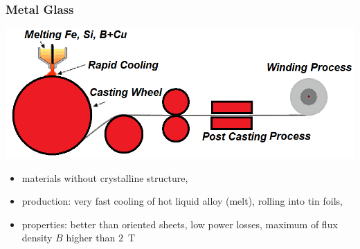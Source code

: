 \documentclass{beamer}
\begin{document}
	\begin{frame}
	\frametitle{Metal Glass}
	\begin{center}
		\includegraphics[scale=0.38]{obr10_amorfniKov.png}
	\end{center}
	
	\begin{itemize}
		\item materials without crystalline structure,
		\item production: very fast cooling of hot liquid alloy (melt), rolling into tin foils,
		\item properties: better than oriented sheets, low power losses, maximum of flux density $B$ higher than $2$~T
	\end{itemize}
  \end{frame}
\end{document}
